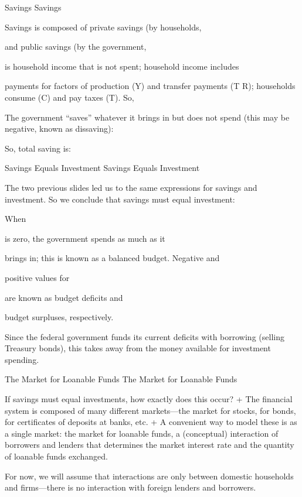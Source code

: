 \documentclass[
  12pt,
  ignorenonframetext,
]{beamer}
\begin{document}
\begin{frame}{Savings}
\label{savings}
Savings

Savings is composed of private savings (by households,

and public savings (by the government,

is household income that is not spent; household income includes

payments for factors of production (Y) and transfer payments (T R);
households consume (C) and pay taxes (T). So,

The government ``saves'' whatever it brings in but does not spend (this
may be negative, known as dissaving):

So, total saving is:
\end{frame}

\begin{frame}{Savings Equals Investment}
\label{savings-equals-investment}
Savings Equals Investment

The two previous slides led us to the same expressions for savings and
investment. So we conclude that savings must equal investment:

When

is zero, the government spends as much as it

brings in; this is known as a balanced budget. Negative and

positive values for

are known as budget deficits and

budget surpluses, respectively.

Since the federal government funds its current deficits with borrowing
(selling Treasury bonds), this takes away from the money available for
investment spending.
\end{frame}

\begin{frame}{The Market for Loanable Funds}
\label{the-market-for-loanable-funds}
The Market for Loanable Funds

If savings must equal investments, how exactly does this occur? + The
financial system is composed of many different markets---the market for
stocks, for bonds, for certificates of deposits at banks, etc. + A
convenient way to model these is as a single market: the market for
loanable funds, a (conceptual) interaction of borrowers and lenders that
determines the market interest rate and the quantity of loanable funds
exchanged.

For now, we will assume that interactions are only between domestic
households and firms---there is no interaction with foreign lenders and
borrowers.
\end{frame}
\end{document}
